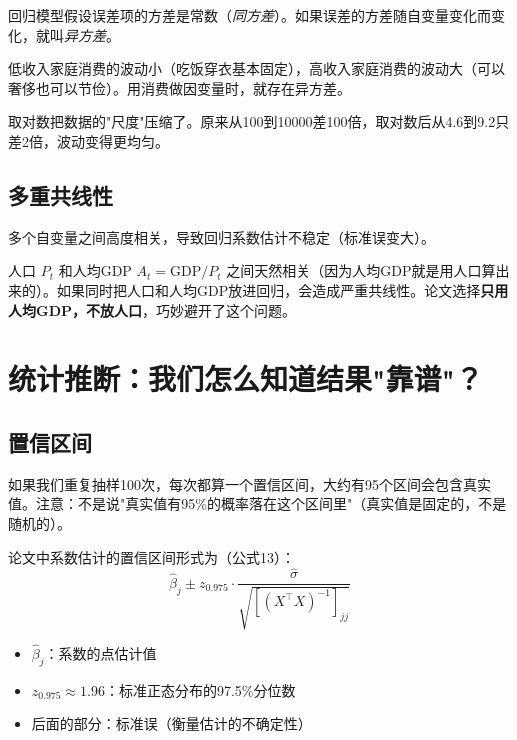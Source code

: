 \documentclass[12pt, a4paper]{article}
\begin{document}
\begin{conceptbox}[异方差]
回归模型假设误差项的方差是常数（\textit{同方差}）。如果误差的方差随自变量变化而变化，就叫\textit{异方差}。
\end{conceptbox}

\begin{examplebox}[异方差的直觉]
低收入家庭消费的波动小（吃饭穿衣基本固定），高收入家庭消费的波动大（可以奢侈也可以节俭）。用消费做因变量时，就存在异方差。
\end{examplebox}

\begin{tipbox}[对数变换如何缓解异方差？]
取对数把数据的"尺度"压缩了。原来从100到10000差100倍，取对数后从4.6到9.2只差2倍，波动变得更均匀。
\end{tipbox}

\subsection{多重共线性}

\begin{conceptbox}[多重共线性]
多个自变量之间高度相关，导致回归系数估计不稳定（标准误变大）。
\end{conceptbox}

\begin{warningbox}[论文中的巧妙处理]
人口 $P_t$ 和人均GDP $A_t = \text{GDP}/P_t$ 之间天然相关（因为人均GDP就是用人口算出来的）。如果同时把人口和人均GDP放进回归，会造成严重共线性。论文选择\textbf{只用人均GDP，不放人口}，巧妙避开了这个问题。
\end{warningbox}

\section{统计推断：我们怎么知道结果"靠谱"？}

\subsection{置信区间}

\begin{conceptbox}[95\%置信区间]
如果我们重复抽样100次，每次都算一个置信区间，大约有95个区间会包含真实值。注意：不是说"真实值有95\%的概率落在这个区间里"（真实值是固定的，不是随机的）。
\end{conceptbox}

论文中系数估计的置信区间形式为（公式13）：
\[
\hat{\beta}_j \pm z_{0.975} \cdot \frac{\hat{\sigma}}{\sqrt{[(X^\top X)^{-1}]_{jj}}}
\]
\begin{itemize}[leftmargin=2em]
\item $\hat{\beta}_j$：系数的点估计值
\item $z_{0.975} \approx 1.96$：标准正态分布的97.5\%分位数
\item 后面的部分：标准误（衡量估计的不确定性）
\end{itemize}
\end{document}

